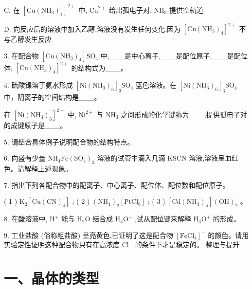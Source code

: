 \documentclass[10pt]{article}
\begin{document}
C. 在 \({\left\lbrack \mathrm{{Cu}}{\left( {\mathrm{{NH}}}_{3}\right) }_{4}\right\rbrack }^{2 + }\) 中, \({\mathrm{{Cu}}}^{2 + }\) 给出孤电子对, \({\mathrm{{NH}}}_{3}\) 提供空轨道

D. 向反应后的溶液中加入乙醇,溶液没有发生任何变化,因为 \({\left\lbrack \mathrm{{Cu}}{\left( {\mathrm{{NH}}}_{3}\right) }_{4}\right\rbrack }^{2 + }\) 不与乙醇发生反应

3. 在配合物 \(\left\lbrack {\mathrm{{Cu}}{\left( {\mathrm{{NH}}}_{3}\right) }_{4}}\right\rbrack {\mathrm{{SO}}}_{4}\) 中,\_\_\_是中心离子,\_\_\_是配位原子,\_\_\_是配位体; \({\left\lbrack \mathrm{{Cu}}{\left( {\mathrm{{NH}}}_{3}\right) }_{4}\right\rbrack }^{2 + }\) 的结构式为\_\_\_。

4. 硫酸镍溶于氨水形成 \({\left\lbrack \mathrm{{Ni}}{\left( {\mathrm{{NH}}}_{3}\right) }_{6}\right\rbrack }_{3}{\mathrm{{SO}}}_{4}\) 蓝色溶液。在 \({\left\lbrack \mathrm{{Ni}}{\left( {\mathrm{{NH}}}_{3}\right) }_{6}\right\rbrack }_{3}{\mathrm{{SO}}}_{4}\) 中，阴离子的空间结构是\_\_\_。

在 \({\left\lbrack \mathrm{{Ni}}{\left( {\mathrm{{NH}}}_{3}\right) }_{6}\right\rbrack }^{2 + }\) 中, \({\mathrm{{Ni}}}^{2 + }\) 与 \({\mathrm{{NH}}}_{3}\) 之间形成的化学键称为\_\_\_,提供孤电子对的成键原子是\_\_\_。

5. 请结合具体例子说明配合物的结构特点。

6. 向盛有少量 \({\mathrm{{NH}}}_{4}\mathrm{{Fe}}{\left( {\mathrm{{SO}}}_{4}\right) }_{2}\) 溶液的试管中滴入几滴 \(\mathrm{{KSCN}}\) 溶液,溶液呈血红色。请解释上述现象。

7. 指出下列各配合物中的配离子、中心离子、配位体、配位数和配位原子。

( 1 ) \({\mathrm{K}}_{2}\left\lbrack {\mathrm{{Cu}}{\left( \mathrm{{CN}}\right) }_{4}}\right\rbrack\) ; ( 2 ) \({\left( {\mathrm{{NH}}}_{4}\right) }_{2}\left\lbrack {\mathrm{{PtCl}}}_{6}\right\rbrack\) ; ( 3 ) \(\left\lbrack {\mathrm{{Cd}}{\left( {\mathrm{{NH}}}_{3}\right) }_{4}}\right\rbrack {\left( \mathrm{{OH}}\right) }_{2}\) 。

8. 在酸溶液中, \({\mathrm{H}}^{ + }\) 能与 \({\mathrm{H}}_{2}\mathrm{O}\) 结合成 \({\mathrm{H}}_{3}{\mathrm{O}}^{ + }\) ,试从配位键来解释 \({\mathrm{H}}_{3}{\mathrm{O}}^{ + }\) 的形成。

9. 工业盐酸 (俗称粗盐酸) 呈亮黄色,已证明了这是配合物 \({\left\lbrack {\mathrm{{FeCl}}}_{4}\right\rbrack }^{ - }\) 的颜色。请用实验定性证明这种配合物只有在高浓度 \({\mathrm{{Cl}}}^{ - }\) 的条件下才是稳定的。 整理与提升

\section*{一、晶体的类型}
\end{document}
